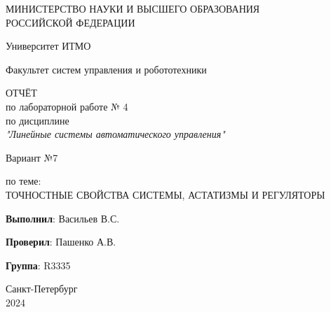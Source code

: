 \thispagestyle{empty}

\begin{center}
    МИНИСТЕРСТВО НАУКИ И ВЫСШЕГО ОБРАЗОВАНИЯ \\ РОССИЙСКОЙ ФЕДЕРАЦИИ

    \vspace{20pt}

    Университет ИТМО

    \vspace{20pt}

    Факультет систем управления и робототехники
\end{center}

\vfill

\begin{center}
    ОТЧЁТ \\  
    по лабораторной работе № 4\\
    по дисциплине \\
    \textit{"Линейные системы автоматического управления"}

    
    \vspace{20pt}
    
    Вариант №7

    \vspace{20pt}

    по теме: \\
    \uppercase{Точностные свойства системы, астатизмы и регуляторы}
\end{center}

\vfill
\hfil

    \noindent \hfill \textbf{Выполнил}: Васильев В.С.

    \vspace{20pt}

    \noindent \hfill \textbf{Проверил}: Пашенко А.В.

    \vspace{20pt}

    \noindent \hfill \textbf{Группа}: R3335

\vfill
\hfil

\begin{center}
    Санкт-Петербург \\ 2024
\end{center}